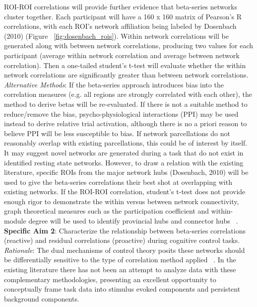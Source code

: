 \documentclass[phd,appendix,figures]{uithesis}
\begin{document}
ROI-ROI correlations will provide further evidence that beta-series networks cluster together. Each participant will have a 160 x 160 matrix of Pearson's R correlations, with each ROI's network affiliation being labeled by Dosenbach (2010) (Figure ~\ref{fig:dosenbach_rois}). 
Within network correlations will be generated along with between network correlations, producing two values for each participant (average within network correlation and average between network correlation).
Then a one-tailed student's t-test will evaluate whether the within network correlations are significantly greater than between network correlations.
\newline
\textit{Alternative Methods}: If the beta-series approach introduces bias into the correlation measures (e.g. all regions are strongly correlated with each other), the method to derive betas will be re-evaluated.
If there is not a suitable method to reduce/remove the bias, psycho-physiological interactions (PPI) may be used instead to derive relative trial activation, although there is no a priori reason to believe PPI will be less susceptible to bias.
If network parcellations do not reasonably overlap with existing parcellations, this could be of interest by itself.
It may suggest novel networks are generated during a task that do not exist in identified resting state networks.
However, to draw a relation with the existing literature, specific ROIs from the major network hubs (Dosenbach, 2010) will be used to give the beta-series correlations their best shot at overlapping with existing networks.
If the ROI-ROI correlation, student's t-test does not provide enough rigor to demonstrate the within versus between network connectivity, graph theoretical measures such as the participation coefficient and within-module degree will be used to identify provincial hubs and connector hubs ~\citep{Wang2010}. 
\newline
\textbf{Specific Aim 2}: Characterize the relationship between beta-series correlations (reactive) and residual correlations (proactive) during cognitive control tasks.
\newline
\textit{Rationale}: The dual mechanisms of control theory posits these networks should be differentially sensitive to the type of correlation method applied ~\citep{Dosenbach2007,Braver2006}. 
In the existing literature there has not been an attempt to analyze data with these  complementary methodologies, presenting an excellent opportunity to conceptually frame task data into stimulus evoked components and persistent background components.
\end{document}
